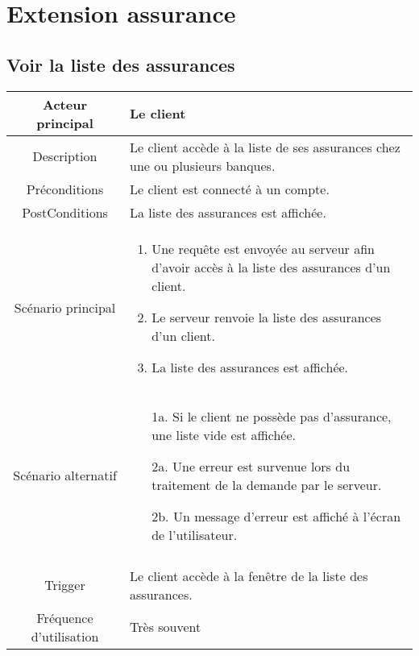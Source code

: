 \documentclass[]{article}
\begin{document}
\section{Extension assurance}

\subsection{Voir la liste des assurances}
\begin{table}[h]
    \begin{tabular}{|c|p{10cm}|}
       \hline
       Acteur principal&Le client\\
       \hline
       Description&Le client accède à la liste de ses assurances chez une ou plusieurs banques.\\
       \hline
       Préconditions&Le client est connecté à un compte.\\
       \hline
       PostConditions&La liste des assurances est affichée.\\
       \hline
       Scénario principal& 
             \begin{enumerate}
                \item Une requête est envoyée au serveur afin d'avoir accès à la liste des assurances d'un client.
                \item Le serveur renvoie la liste des assurances d'un client.
                \item La liste des assurances est affichée.
             \end{enumerate}     \\
       \hline
       Scénario alternatif&
        \begin{itemize}
            \item[1a.] Si le client ne possède pas d'assurance, une liste vide est affichée.
            \item[2a.] Une erreur est survenue lors du traitement de la demande par le serveur.
            \item[2b.] Un message d'erreur est affiché à l'écran de l'utilisateur. 
        \end{itemize}     \\
       \\
       \hline
       Trigger&Le client accède à la fenêtre de la liste des assurances.\\
       \hline
       Fréquence d'utilisation&Très souvent\\
       \hline
    \end{tabular}
 \end{table}
\end{document}
